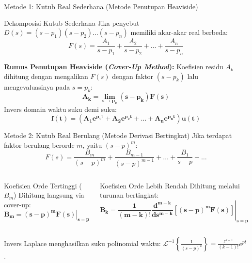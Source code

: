 \documentclass[aspectratio=169,10pt]{beamer}
\begin{document}
\begin{frame}{Metode 1: Kutub Real Sederhana (Metode Penutupan Heaviside)}
  \begin{block}{Dekomposisi Kutub Sederhana}
    Jika penyebut $D(s) = (s - p_1)(s - p_2)\dots(s - p_n)$ memiliki akar-akar real berbeda:
    \begin{equation}
      F(s) = \frac{A_1}{s - p_1} + \frac{A_2}{s - p_2} + \dots + \frac{A_n}{s - p_n}
    \end{equation}
  \end{block}
  \vspace{0.15cm}
  \textbf{Rumus Penutupan Heaviside (\textit{Cover-Up Method}):}
  Koefisien residu $A_k$ dihitung dengan mengalikan $F(s)$ dengan faktor $(s - p_k)$ lalu mengevaluasinya pada $s = p_k$:
  \begin{equation}
    \mathbf{A_k = \lim_{s \to p_k} (s - p_k) F(s)}
  \end{equation}
  Invers domain waktu suku demi suku:
  \begin{equation*}
    \mathbf{f(t) = \left( A_1 e^{p_1 t} + A_2 e^{p_2 t} + \dots + A_n e^{p_n t} \right) u(t)}
  \end{equation*}
\end{frame}

\begin{frame}{Metode 2: Kutub Real Berulang (Metode Derivasi Bertingkat)}
  Jika terdapat faktor berulang berorde $m$, yaitu $(s - p)^m$:
  \begin{equation}
    F(s) = \frac{B_m}{(s - p)^m} + \frac{B_{m-1}}{(s - p)^{m-1}} + \dots + \frac{B_1}{s - p} + \dots
  \end{equation}
  \begin{columns}[t]
    \begin{block}{Koefisien Orde Tertinggi ($B_m$)}
      Dihitung langsung via cover-up:
      \begin{equation*}
        \mathbf{B_m = \left. (s - p)^m F(s) \right|_{s = p}}
      \end{equation*}
    \end{block}

    \begin{alertblock}{Koefisien Orde Lebih Rendah}
      Dihitung melalui turunan bertingkat:
      \begin{equation*}
        \mathbf{B_k = \frac{1}{(m - k)!} \left. \frac{d^{m-k}}{ds^{m-k}} [(s - p)^m F(s)] \right|_{s = p}}
      \end{equation*}
    \end{alertblock}
  \end{columns}
  \vspace{0.2cm}
  Invers Laplace menghasilkan suku polinomial waktu: $\mathcal{L}^{-1}\left\{\frac{1}{(s - p)^k}\right\} = \frac{t^{k-1}}{(k-1)!} e^{pt}$.
\end{frame}
\end{document}
